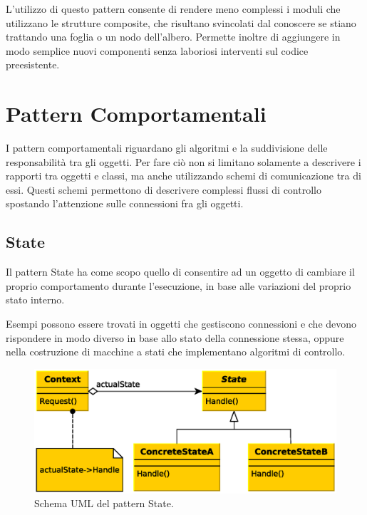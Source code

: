 L'utilizzo di questo pattern consente di rendere meno complessi i moduli che utilizzano le strutture composite, che risultano svincolati dal conoscere se stiano trattando una foglia o un nodo dell'albero. Permette inoltre di aggiungere in modo semplice nuovi componenti senza laboriosi interventi sul codice preesistente.


\section{Pattern Comportamentali}
I pattern comportamentali riguardano gli algoritmi e la suddivisione delle responsabilit\`a tra gli oggetti. Per fare ci\`o non si limitano solamente a descrivere i rapporti tra oggetti e classi, ma anche utilizzando schemi di comunicazione tra di essi. Questi schemi permettono di descrivere complessi flussi di controllo spostando l'attenzione sulle connessioni fra gli oggetti.

\subsection{State}
\label{sub:state}
Il pattern State ha come scopo quello di consentire ad un oggetto di cambiare il proprio comportamento durante l'esecuzione, in base alle variazioni del proprio stato interno.

Esempi possono essere trovati in oggetti che gestiscono connessioni e che devono rispondere in modo diverso in base allo stato della connessione stessa, oppure nella costruzione di macchine a stati che implementano algoritmi di controllo.

\begin{figure}
\begin{center}
\includegraphics[width=12cm]{Immagini/StatePattern}
\caption{Schema UML del pattern State.\label{f:statepattern}} 
\end{center} 
\end{figure}


